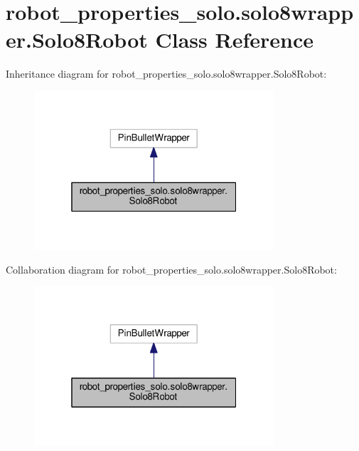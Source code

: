 \hypertarget{classrobot__properties__solo_1_1solo8wrapper_1_1Solo8Robot}{}\section{robot\+\_\+properties\+\_\+solo.\+solo8wrapper.\+Solo8\+Robot Class Reference}
\label{classrobot__properties__solo_1_1solo8wrapper_1_1Solo8Robot}


Inheritance diagram for robot\+\_\+properties\+\_\+solo.\+solo8wrapper.\+Solo8\+Robot\+:
\nopagebreak
\begin{figure}[H]
\begin{center}
\leavevmode
\includegraphics[width=253pt]{classrobot__properties__solo_1_1solo8wrapper_1_1Solo8Robot__inherit__graph}
\end{center}
\end{figure}


Collaboration diagram for robot\+\_\+properties\+\_\+solo.\+solo8wrapper.\+Solo8\+Robot\+:
\nopagebreak
\begin{figure}[H]
\begin{center}
\leavevmode
\includegraphics[width=253pt]{classrobot__properties__solo_1_1solo8wrapper_1_1Solo8Robot__coll__graph}
\end{center}
\end{figure}
